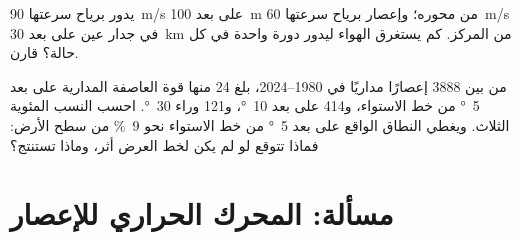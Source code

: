 \begin{exercise}[$\star\star\star$]\label{exo:g10:storms-and-cyclones:14}
 يدور برياح سرعتها \qty{90}{m/s} على بعد \qty{100}{m} من محوره؛
وإعصار برياح سرعتها \qty{60}{m/s} في جدار عين على بعد \qty{30}{km} من
المركز. كم يستغرق الهواء ليدور دورة واحدة في كل حالة؟ قارن.
\end{exercise}

\begin{exercise}[$\star\star\star$]\label{exo:g10:storms-and-cyclones:15}
من بين \num{3888} إعصارًا مداريًا في 1980--2024، بلغ 24 منها قوة العاصفة
المدارية على بعد \qty{5}{\degree} من خط الاستواء، و414 على بعد
\qty{10}{\degree}، و121 وراء \qty{30}{\degree}. احسب النسب المئوية الثلاث. ويغطي
النطاق الواقع على بعد \qty{5}{\degree} من خط الاستواء نحو
\qty{9}{\percent} من سطح الأرض: فماذا تتوقع لو لم يكن لخط العرض أثر، وماذا
تستنتج؟
\end{exercise}

\section{مسألة: المحرك الحراري للإعصار}

